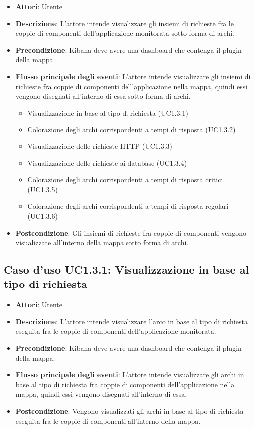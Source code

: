 \begin{itemize}
	\item \textbf{Attori}: Utente
	\item \textbf{Descrizione}: L'attore intende visualizzare gli insiemi di richieste fra le coppie di componenti dell'applicazione monitorata sotto forma di archi.
	\item \textbf{Precondizione}: Kibana deve avere una dashboard che contenga il plugin della mappa.
	\item \textbf{Flusso principale degli eventi}: L'attore intende visualizzare gli insiemi di richieste fra coppie di componenti dell'applicazione nella mappa, quindi essi vengono disegnati all'interno di essa sotto forma di archi.
	\begin{itemize}
		\item Visualizzazione in base al tipo di richiesta (UC1.3.1)
		\item Colorazione degli archi corrispondenti a tempi di risposta (UC1.3.2)
		\item Visualizzazione delle richieste HTTP (UC1.3.3)
		\item Visualizzazione delle richieste ai database (UC1.3.4)
		\item Colorazione degli archi corrispondenti a tempi di risposta critici (UC1.3.5)
		\item Colorazione degli archi corrispondenti a tempi di risposta regolari (UC1.3.6)
	\end{itemize}
	\item \textbf{Postcondizione}: Gli insiemi di richieste fra coppie di componenti vengono visualizzate all'interno della mappa sotto forma di archi.
\end{itemize}
\subsection{Caso d'uso UC1.3.1: Visualizzazione in base al tipo di richiesta}
\begin{itemize}
	\item \textbf{Attori}: Utente
	\item \textbf{Descrizione}: L'attore intende visualizzare l'arco in base al tipo di richiesta eseguita fra le coppie di componenti dell'applicazione monitorata.
	\item \textbf{Precondizione}: Kibana deve avere una dashboard che contenga il plugin della mappa.
	\item \textbf{Flusso principale degli eventi}: L'attore intende visualizzare gli archi in base al tipo di richiesta fra coppie di componenti dell'applicazione nella mappa, quindi essi vengono disegnati all'interno di essa.
	\item \textbf{Postcondizione}: Vengono visualizzati gli archi in base al tipo di richiesta eseguita fra le coppie di componenti all'interno della mappa.
\end{itemize}
